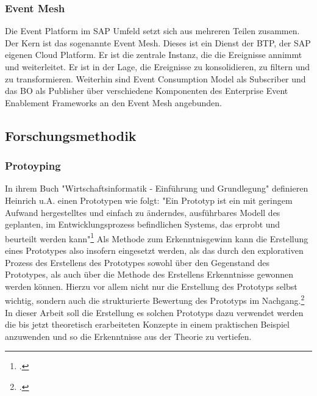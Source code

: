 \subsubsection*{Event Mesh}
Die Event Platform im  SAP Umfeld setzt sich aus mehreren Teilen zusammen. Der Kern ist das sogenannte Event Mesh. Dieses ist ein Dienst der \ac{BTP}, der SAP eigenen Cloud Platform. Er ist die zentrale Instanz, die die Ereignisse annimmt und weiterleitet. Er ist in der Lage, die Ereignisse zu konsolidieren, zu filtern und zu transformieren. \citepls Weiterhin sind Event Consumption Model als Subscriber und das \ac{BO} als Publisher über verschiedene Komponenten des Enterprise Event Enablement Frameworks an den Event Mesh angebunden. \citepls

\subsection{Forschungsmethodik}
\subsubsection*{Protoyping}
\label{Protoyping}
In ihrem Buch "Wirtschaftsinformatik - Einführung und Grundlegung" definieren Heinrich u.A. einen Prototypen wie folgt: "Ein Prototyp ist ein mit geringem Aufwand hergestelltes und einfach zu änderndes, ausführbares Modell des geplanten, im Entwicklungsprozess befindlichen Systems, das erprobt und beurteilt werden kann"\footcite[S. 114]{heinrich2007wirtschaftsinformatik}
Als Methode zum Erkenntnisgewinn kann die Erstellung eines Prototypes also insofern eingesetzt werden, als das durch den explorativen Prozess des Erstellens des Prototypes sowohl über den Gegenstand des Prototypes, als auch über die Methode des Erstellens Erkenntnisse gewonnen werden können. Hierzu vor allem nicht nur die Erstellung des Prototyps selbst wichtig, sondern auch die strukturierte Bewertung des Prototyps im Nachgang.\footcite[S. 119]{heinrich2007wirtschaftsinformatik} In dieser Arbeit soll die Erstellung es solchen Prototyps dazu verwendet werden die bis jetzt theoretisch erarbeiteten Konzepte in einem praktischen Beispiel anzuwenden und so die Erkenntnisse aus der Theorie zu vertiefen.


